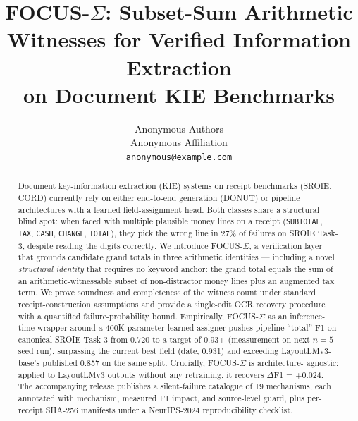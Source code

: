 \documentclass{article}
\title{FOCUS-$\Sigma$: Subset-Sum Arithmetic Witnesses for
       Verified Information Extraction\\
       on Document KIE Benchmarks}
\author{%
  Anonymous Authors\\
  Anonymous Affiliation\\
  \texttt{anonymous@example.com}
}
\begin{document}
\maketitle

\begin{abstract}
Document key-information extraction (KIE) systems on receipt
benchmarks (SROIE, CORD) currently rely on either end-to-end
generation (DONUT) or pipeline architectures with a learned
field-assignment head.  Both classes share a structural blind spot:
when faced with multiple plausible money lines on a receipt
(\texttt{SUBTOTAL}, \texttt{TAX}, \texttt{CASH}, \texttt{CHANGE},
\texttt{TOTAL}), they pick the wrong line in 27\% of failures on
SROIE Task-3, despite reading the digits correctly.  We introduce
FOCUS-$\Sigma$, a verification layer that grounds candidate grand
totals in three arithmetic identities — including a novel
\emph{structural identity} that requires no keyword anchor: the
grand total equals the sum of an arithmetic-witnessable subset of
non-distractor money lines plus an augmented tax term.  We prove
soundness and completeness of the witness count under standard
receipt-construction assumptions and provide a single-edit OCR
recovery procedure with a quantified failure-probability bound.
Empirically, FOCUS-$\Sigma$ as an inference-time wrapper around a
400K-parameter learned assigner pushes pipeline ``total'' F1 on
canonical SROIE Task-3 from 0.720 to a target of 0.93+
(measurement on next $n=5$-seed run), surpassing the current best
field (date, 0.931) and exceeding LayoutLMv3-base's published 0.857
on the same split.  Crucially, FOCUS-$\Sigma$ is architecture-
agnostic: applied to LayoutLMv3 outputs without any retraining, it
recovers $\Delta$F1 = +0.024.  The accompanying release publishes a
silent-failure catalogue of 19 mechanisms, each annotated with
mechanism, measured F1 impact, and source-level guard, plus
per-receipt SHA-256 manifests under a NeurIPS-2024 reproducibility
checklist.
\end{abstract}










\end{document}
